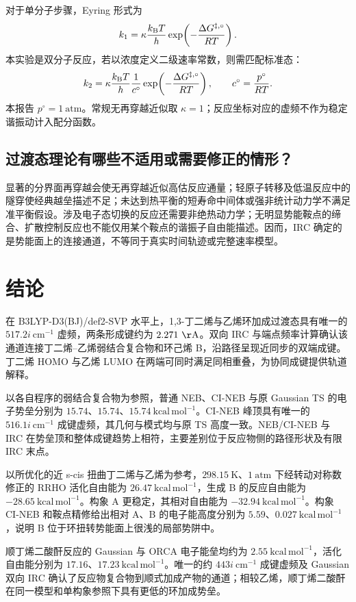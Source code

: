 \documentclass[a4paper,12pt]{article}
\newcommand{\kcalmol}{\mathrm{kcal\,mol^{-1}}}
\begin{document}
对于单分子步骤，Eyring 形式为
\begin{equation}
k_1=\kappa\frac{k_{\rm B}T}{h}
\exp\!\left(-\frac{\Delta G^{\ddagger,\circ}}{RT}\right).
\end{equation}
本实验是双分子反应，若以浓度定义二级速率常数，则需匹配标准态：
\begin{equation}
k_2=\kappa\frac{k_{\rm B}T}{h}\frac{1}{c^\circ}
\exp\!\left(-\frac{\Delta G^{\ddagger,\circ}}{RT}\right),
\qquad c^\circ=\frac{p^\circ}{RT}.
\end{equation}
本报告 $p^\circ=1\ \mathrm{atm}$。常规无再穿越近似取 $\kappa=1$；反应坐标对应的虚频不作为稳定谐振动计入配分函数。

\subsection{过渡态理论有哪些不适用或需要修正的情形？}
显著的分界面再穿越会使无再穿越近似高估反应通量；轻原子转移及低温反应中的隧穿使经典越垒描述不足；未达到热平衡的短寿命中间体或强非统计动力学不满足准平衡假设。涉及电子态切换的反应还需要非绝热动力学；无明显势能鞍点的缔合、扩散控制反应也不能仅用某个鞍点的谐振子自由能描述。因而，IRC 确定的是势能面上的连接通道，不等同于真实时间轨迹或完整速率模型。

\section{结论}
在 B3LYP-D3(BJ)/def2-SVP 水平上，1,3-丁二烯与乙烯环加成过渡态具有唯一的 $517.2i\ \mathrm{cm^{-1}}$ 虚频，两条形成键约为 $2.271\ \mathrm{\AA}$。双向 IRC 与端点频率计算确认该通道连接丁二烯--乙烯弱结合复合物和环己烯 B，沿路径呈现近同步的双端成键。丁二烯 HOMO 与乙烯 LUMO 在两端可同时满足同相重叠，为协同成键提供轨道解释。

以各自程序的弱结合复合物为参照，普通 NEB、CI-NEB 与原 Gaussian TS 的电子势垒分别为 $15.74$、$15.74$、$15.74\ \kcalmol$。CI-NEB 峰顶具有唯一的 $516.1i\ \mathrm{cm^{-1}}$ 成键虚频，其几何与模式均与原 TS 高度一致。NEB/CI-NEB 与 IRC 在势垒顶和整体成键趋势上相符，主要差别位于反应物侧的路径形状及有限 IRC 末点。

以所优化的近 s-cis 扭曲丁二烯与乙烯为参考，$298.15\ \mathrm{K}$、$1\ \mathrm{atm}$ 下经转动对称数修正的 RRHO 活化自由能为 $26.47\ \kcalmol$，生成 B 的反应自由能为 $-28.65\ \kcalmol$。构象 A 更稳定，其相对自由能为 $-32.94\ \kcalmol$。构象 CI-NEB 和鞍点精修给出相对 A、B 的电子能高度分别为 $5.59$、$0.027\ \kcalmol$，说明 B 位于环扭转势能面上很浅的局部势阱中。

顺丁烯二酸酐反应的 Gaussian 与 ORCA 电子能垒均约为 $2.55\ \kcalmol$，活化自由能分别为 $17.16$、$17.23\ \kcalmol$。唯一的约 $443i\ \mathrm{cm^{-1}}$ 成键虚频及 Gaussian 双向 IRC 确认了反应物复合物到顺式加成产物的通道；相较乙烯，顺丁烯二酸酐在同一模型和单构象参照下具有更低的环加成势垒。
\end{document}
